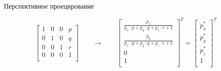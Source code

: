 \documentclass{beamer}
\begin{document}
\begin{frame}{Перспективное проецирование}
{				\[
					\begin{bmatrix}
						1 & 0 & 0 & p \\
						0 & 1 & 0 & q \\
						0 & 0 & 1 & r \\
						0 & 0 & 0 & 1 \\
					\end{bmatrix}	
					\qquad
					\to
					\qquad
					\begin{bmatrix}
						\frac{p_x}{p_x \cdot p + p_y \cdot q + p_z \cdot r+1} \\
						\frac{p_y}{p_x \cdot p + p_y \cdot q + p_z \cdot r+1} \\
						0 \\
						1	\\
					\end{bmatrix}^T
					=					
					\begin{bmatrix}
						p_x^* \\
						p_y^*	\\
						p_z^* \\
						1			\\
					\end{bmatrix}^T
				\]

			}
	\end{frame}
\end{document}
